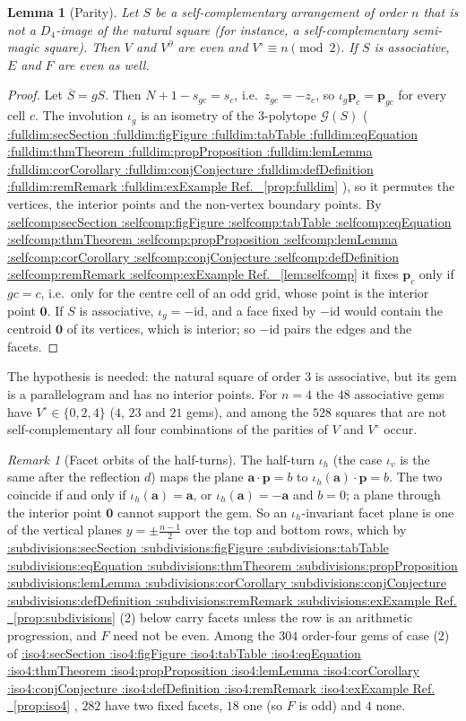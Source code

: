 \documentclass[11pt,a4paper]{article}
\makeatletter
\def\Cref@getprefix#1:#2\relax{#1}
\def\Cref@prefix@sec{sec}
\def\Cref@prefix@fig{fig}
\def\Cref@prefix@tab{tab}
\def\Cref@prefix@eq{eq}
\def\Cref@prefix@thm{thm}
\def\Cref@prefix@prop{prop}
\def\Cref@prefix@lem{lem}
\def\Cref@prefix@cor{cor}
\def\Cref@prefix@conj{conj}
\def\Cref@prefix@def{def}
\def\Cref@prefix@rem{rem}
\def\Cref@prefix@ex{ex}
\def\Cref@type@cap#1{%
  \edef\Cref@tmp{#1}%
  \ifx\Cref@tmp\Cref@prefix@sec Section%
  \else\ifx\Cref@tmp\Cref@prefix@fig Figure%
  \else\ifx\Cref@tmp\Cref@prefix@tab Table%
  \else\ifx\Cref@tmp\Cref@prefix@eq Equation%
  \else\ifx\Cref@tmp\Cref@prefix@thm Theorem%
  \else\ifx\Cref@tmp\Cref@prefix@prop Proposition%
  \else\ifx\Cref@tmp\Cref@prefix@lem Lemma%
  \else\ifx\Cref@tmp\Cref@prefix@cor Corollary%
  \else\ifx\Cref@tmp\Cref@prefix@conj Conjecture%
  \else\ifx\Cref@tmp\Cref@prefix@def Definition%
  \else\ifx\Cref@tmp\Cref@prefix@rem Remark%
  \else\ifx\Cref@tmp\Cref@prefix@ex Example%
  \else Ref.%
  \fi\fi\fi\fi\fi\fi\fi\fi\fi\fi\fi\fi
}
\DeclareRobustCommand{\Cref}[1]{%
  \begingroup
  \edef\Cref@label{#1}%
  \edef\Cref@prefix{\expandafter\Cref@getprefix\Cref@label:\relax}%
  \hyperref[#1]{\Cref@type@cap{\Cref@prefix}~\ref*{#1}}%
  \endgroup
}
\theoremstyle{plain}
\newtheorem{lemma}[theorem]{Lemma}
\theoremstyle{definition}
\theoremstyle{remark}
\newtheorem{remark}[theorem]{Remark}
\makeatother
\begin{document}
\begin{lemma}[Parity]
\label{lem:parity}
Let $S$ be a self-complementary arrangement of order $n$ that is not a $D_4$-image of the natural square (for instance, a self-complementary semi-magic square). Then $V$ and $V^\partial$ are even and $V^\circ\equiv n\pmod2$. If $S$ is associative, $E$ and $F$ are even as well.
\end{lemma}

\begin{proof}
Let $\overline S=gS$. Then $N+1-s_{gc}=s_c$, i.e.\ $z_{gc}=-z_c$, so $\iota_g\mathbf p_c=\mathbf p_{gc}$ for every cell $c$.
The involution $\iota_g$ is an isometry of the $3$-polytope $\mathcal G(S)$ (\Cref{prop:fulldim}), so it permutes the vertices, the interior points and the non-vertex boundary points.
By \Cref{lem:selfcomp} it fixes $\mathbf p_c$ only if $gc=c$, i.e.\ only for the centre cell of an odd grid, whose point is the interior point $\mathbf 0$.
If $S$ is associative, $\iota_g=-\mathrm{id}$, and a face fixed by $-\mathrm{id}$ would contain the centroid $\mathbf 0$ of its vertices, which is interior; so $-\mathrm{id}$ pairs the edges and the facets.
\end{proof}

The hypothesis is needed: the natural square of order $3$ is associative, but its gem is a parallelogram and has no interior points.
For $n=4$ the $48$ associative gems have $V^\circ\in\{0,2,4\}$ ($4$, $23$ and $21$ gems), and among the $528$ squares that are not self-complementary all four combinations of the parities of $V$ and $V^\circ$ occur.

\begin{remark}[Facet orbits of the half-turns]
\label{rem:facet-orbits}
The half-turn $\iota_h$ (the case $\iota_v$ is the same after the reflection $d$) maps the plane $\mathbf a\cdot\mathbf p=b$ to $\iota_h(\mathbf a)\cdot\mathbf p=b$. The two coincide if and only if $\iota_h(\mathbf a)=\mathbf a$, or $\iota_h(\mathbf a)=-\mathbf a$ and $b=0$; a plane through the interior point $\mathbf 0$ cannot support the gem. So an $\iota_h$-invariant facet plane is one of the vertical planes $y=\pm\frac{n-1}2$ over the top and bottom rows, which by \Cref{prop:subdivisions}(2) below carry facets unless the row is an arithmetic progression, and $F$ need not be even. Among the $304$ order-four gems of case (2) of \Cref{prop:iso4}, $282$ have two fixed facets, $18$ one (so $F$ is odd) and $4$ none.
\end{remark}
\end{document}
